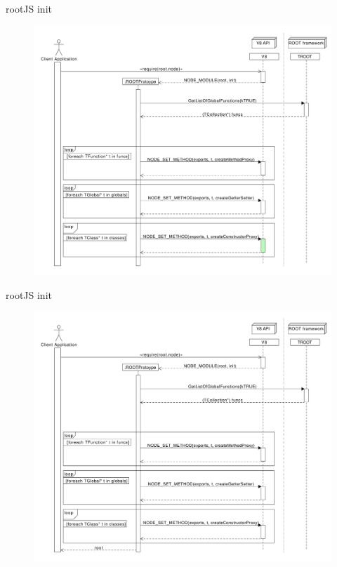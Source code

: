 \begin{frame}{rootJS init}
  \begin{figure}[htb]
    \centering
      \includegraphics[width=\textwidth, height=.85\textheight, keepaspectratio]{./resources/initialize/initialize_h6.pdf}
  \end{figure}
\end{frame}

\begin{frame}{rootJS init}
  \begin{figure}[htb]
    \centering
      \includegraphics[width=\textwidth, height=.85\textheight, keepaspectratio]{./resources/initialize/initialize_h0.pdf}
  \end{figure}
\end{frame}
